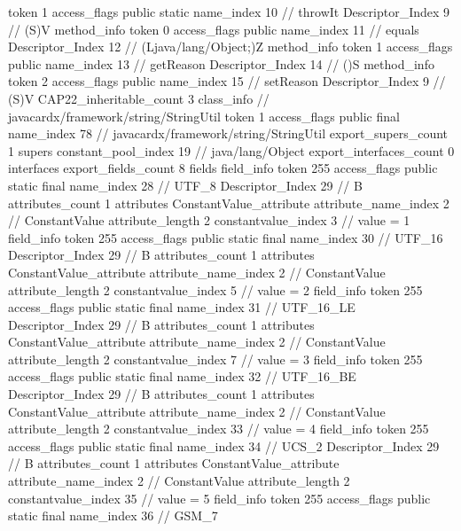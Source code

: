 {{{{{					token	1
					access_flags	public static
					name_index	10		// throwIt
					Descriptor_Index	9		// (S)V
				}
				method_info {
					token	0
					access_flags	public
					name_index	11		// equals
					Descriptor_Index	12		// (Ljava/lang/Object;)Z
				}
				method_info {
					token	1
					access_flags	public
					name_index	13		// getReason
					Descriptor_Index	14		// ()S
				}
				method_info {
					token	2
					access_flags	public
					name_index	15		// setReason
					Descriptor_Index	9		// (S)V
				}
			}
			CAP22_inheritable_count	3
		}
		class_info {		// javacardx/framework/string/StringUtil
			token	1
			access_flags	public final
			name_index	78		// javacardx/framework/string/StringUtil
			export_supers_count	1
			supers {
				constant_pool_index	19		// java/lang/Object
			}
			export_interfaces_count	0
			interfaces {
			}
			export_fields_count	8
			fields {
			field_info {
				token	255
				access_flags	public static final
				name_index	28		// UTF_8
				Descriptor_Index	29		// B
				attributes_count	1
				attributes {
				ConstantValue_attribute {
					attribute_name_index	2		// ConstantValue
					attribute_length	2
					constantvalue_index	3		// value = 1
				}
				}
			}
			field_info {
				token	255
				access_flags	public static final
				name_index	30		// UTF_16
				Descriptor_Index	29		// B
				attributes_count	1
				attributes {
				ConstantValue_attribute {
					attribute_name_index	2		// ConstantValue
					attribute_length	2
					constantvalue_index	5		// value = 2
				}
				}
			}
			field_info {
				token	255
				access_flags	public static final
				name_index	31		// UTF_16_LE
				Descriptor_Index	29		// B
				attributes_count	1
				attributes {
				ConstantValue_attribute {
					attribute_name_index	2		// ConstantValue
					attribute_length	2
					constantvalue_index	7		// value = 3
				}
				}
			}
			field_info {
				token	255
				access_flags	public static final
				name_index	32		// UTF_16_BE
				Descriptor_Index	29		// B
				attributes_count	1
				attributes {
				ConstantValue_attribute {
					attribute_name_index	2		// ConstantValue
					attribute_length	2
					constantvalue_index	33		// value = 4
				}
				}
			}
			field_info {
				token	255
				access_flags	public static final
				name_index	34		// UCS_2
				Descriptor_Index	29		// B
				attributes_count	1
				attributes {
				ConstantValue_attribute {
					attribute_name_index	2		// ConstantValue
					attribute_length	2
					constantvalue_index	35		// value = 5
				}
				}
			}
			field_info {
				token	255
				access_flags	public static final
				name_index	36		// GSM_7
}}}}}
